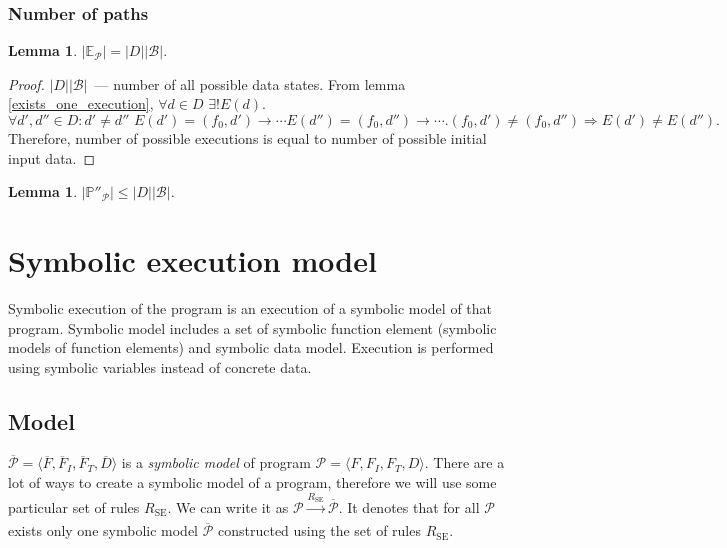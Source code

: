 \documentclass[oneside,a4]{article}  %
\newcommand{\level}{\section}
\newcommand{\sublevel}{\subsection}
\newcommand{\subsublevel}{\subsubsection}
\newcommand{\Ra}{\Rightarrow}
\newcommand{\ra}{\rightarrow}
\newcommand{\term}[1]{\textit{#1}\index{#1}}
\newcommand{\se}{\overline}    %
\newtheorem{lemma}[theorem]{Lemma}
\begin{document}
\subsublevel*{Number of paths}

\begin{lemma}
    $|\mathds{E}_\mathcal{P}| = |D| |\mathcal{B}|$.
\end{lemma}

\begin{proof}
    $|D| |\mathcal{B}|$~--- number of all possible data states.
    From lemma \ref{exists_one_execution},
        $\forall d \in D \,\, \exists! E(d)$.
    $\forall d', d'' \in D : d' \neq d'' \,\, E(d') = (f_0, d') \ra \cdots
        E(d'') = (f_0, d'') \ra \cdots.
        (f_0, d') \neq (f_0, d'') \Ra E(d') \neq E(d'').$
    Therefore, number of possible executions is equal to number of
    possible initial input data.
\end{proof}

\begin{lemma}
    $|\mathds{P}''_\mathcal{P}| \le |D| |\mathcal{B}|$.
\end{lemma}

\level{Symbolic execution model}

Symbolic execution of the program is
an execution of a symbolic model of that program.
Symbolic model includes a set of symbolic function element
(symbolic models of function elements) and
symbolic data model.
Execution is performed using symbolic variables instead of concrete data.

\sublevel{Model}

$\se{\mathcal{P}} = \langle \se{F}, \se{F}_I, \se{F}_T, \se{D} \rangle$
is a \term{symbolic model} of program
$\mathcal{P} = \langle F, F_I, F_T, D \rangle$.
There are a lot of ways to create a symbolic model of a program,
therefore we will use some particular set of rules $R_\text{SE}$.
We can write it as
$\mathcal{P} \xrightarrow[]{R_\text{SE}} \se{\mathcal{P}}$.
It denotes that for all $\mathcal{P}$ exists only one symbolic model
$\se{\mathcal{P}}$ constructed using the set of rules $R_\text{SE}$.
\end{document}
